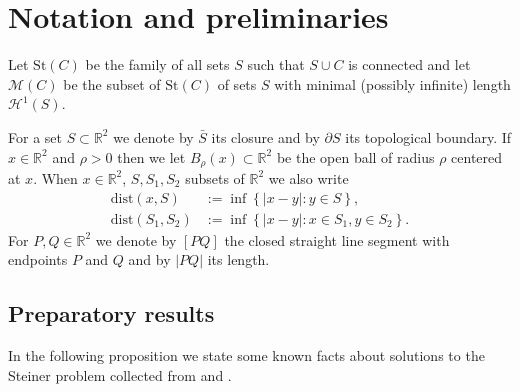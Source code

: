 \documentclass{amsart}
\newcommand{\RR}{\mathbb R}
\renewcommand{\H}{\mathcal H}
\newcommand{\abs}[1]{\left\vert #1 \right\vert}
\newcommand{\ENCLOSE}[1]{\left\{#1\right\}}
\newcommand{\St}{\mathrm{St}}
\newcommand{\M}{\mathcal{M}}
\renewcommand{\H}{\mathcal{H}}
\newcommand{\dist}{\mathrm{dist}}
\newtheorem{conjecture}[theorem]{Conjecture}
\theoremstyle{definition}
\theoremstyle{remark}
\begin{document}
\section{Notation and preliminaries}

Let $\St(C)$ be the family of all sets $S$ such that 
$S\cup C$ is connected and 
let $\M(C)$ be the subset of $\St(C)$ of sets $S$ 
with minimal (possibly infinite) length $\H^1(S)$.

For a set $S\subset \RR^2$ we denote by $\bar S$ 
its closure and by $\partial S$ its topological boundary.
If $x\in \RR^2$ and $\rho>0$ then we let $B_\rho(x)\subset \RR^2$ 
be the open ball of radius 
$\rho$ centered at $x$.
When $x\in \RR^2$, $S,S_1,S_2$ subsets of $\RR^2$
we also write
\begin{align*}
  \dist(x,S)
    &:=\inf\ENCLOSE{\abs{x-y}:y\in S},\\
  \dist(S_1,S_2) 
    &:= \inf\ENCLOSE{\abs{x-y}\colon x\in S_1, y\in S_2}.
\end{align*}
For $P,Q\in \RR^2$ we denote by $[PQ]$ the closed straight line 
segment with endpoints $P$ and $Q$ and by $\abs{PQ}$ its length.

% 
% 

\subsection{Preparatory results}

In the following proposition we state some known facts about 
solutions to the Steiner problem collected from \cite{PaoSte12}
and \cite{IvaTuz94}.
\end{document}
